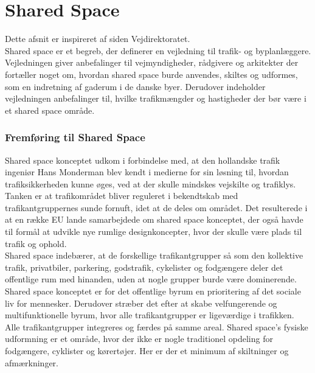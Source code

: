 \section{Shared Space}
\label{sec:shared_space}
Dette afsnit er inspireret af siden Vejdirektoratet. \autocite{vejlednigomss2013} \\
Shared space er et begreb, der definerer en vejledning til trafik- og byplanlæggere. Vejledningen giver anbefalinger til vejmyndigheder, rådgivere og arkitekter der fortæller noget om, hvordan shared space burde anvendes, skiltes og udformes, som en indretning af gaderum i de danske byer. Derudover indeholder vejledningen anbefalinger til, hvilke trafikmængder og hastigheder der bør være i et shared space område.

\subsubsection{Fremføring til Shared Space}
\label{subs:fremforing_til_shared_space}

Shared space konceptet udkom i forbindelse med, at den hollandske trafik ingeniør Hans Monderman blev kendt i medierne for sin løsning til, hvordan trafiksikkerheden kunne øges, ved at der skulle mindskes vejskilte og trafiklys. Tanken er at trafikområdet bliver reguleret i bekendtskab med trafikantgruppernes sunde fornuft, idet at de deles om området. Det resulterede i at en række EU lande samarbejdede om shared space konceptet, der også havde til formål at udvikle nye rumlige designkoncepter, hvor der skulle være plads til trafik og ophold. \autocite{DEFT2006}
\\
Shared space indebærer, at de forskellige trafikantgrupper så som den kollektive trafik, privatbiler, parkering, godstrafik, cykelister og fodgængere deler det offentlige rum med hinanden, uden at nogle grupper burde være dominerende. Shared space konceptet er for det offentlige byrum en prioritering af det sociale liv for mennesker. Derudover stræber det efter at skabe velfungerende og multifunktionelle byrum, hvor alle trafikantgrupper er ligeværdige i trafikken. Alle trafikantgrupper integreres og færdes på samme areal. Shared space’s fysiske udformning er et område, hvor der ikke er nogle traditionel opdeling for fodgængere, cyklister og kørertøjer. Her er der et minimum af skiltninger og afmærkninger.
\\\\
